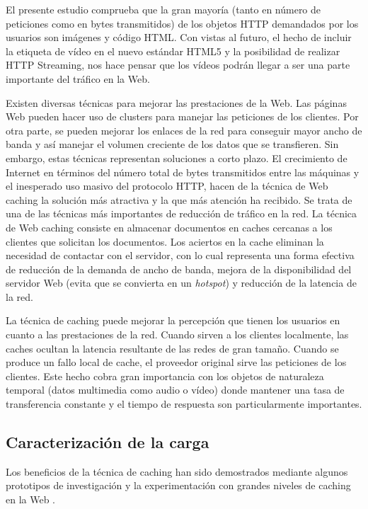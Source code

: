 \documentclass[twocolumn]{Jornadas}
\begin{document}
El presente estudio comprueba que la gran mayoría (tanto en número de peticiones como en bytes transmitidos) de los objetos HTTP demandados por los usuarios son imágenes y código HTML. Con vistas al futuro, el hecho de incluir la etiqueta de vídeo en el nuevo estándar HTML5 y la posibilidad de realizar HTTP Streaming, nos hace pensar que los vídeos podrán llegar a ser una parte importante del tráfico en la Web.

Existen diversas técnicas para mejorar las prestaciones de la Web. Las páginas Web pueden hacer uso de clusters para manejar las peticiones de los clientes. Por otra parte, se pueden mejorar los enlaces de la red para conseguir mayor ancho de banda y así manejar el volumen creciente de los datos que se transfieren. Sin embargo, estas técnicas representan soluciones a corto plazo. El crecimiento de Internet en términos del número total de bytes transmitidos entre las máquinas y el inesperado uso masivo del protocolo HTTP, hacen de la técnica de Web caching la solución más atractiva y la que más atención ha recibido. Se trata de una de las técnicas más importantes de reducción de tráfico en la red. La técnica de Web caching consiste en almacenar documentos en caches cercanas a los clientes que solicitan los documentos. Los aciertos en la cache eliminan la necesidad de contactar con el servidor, con lo cual representa una forma efectiva de reducción de la demanda de ancho de banda, mejora de la disponibilidad del servidor Web (evita que se convierta en un \emph{hotspot}) y reducción de la latencia de la red.

La técnica de caching puede mejorar la percepción que tienen los usuarios en cuanto a las prestaciones de la red. Cuando sirven a los clientes localmente, las caches ocultan la latencia resultante de las redes de gran tamaño. Cuando se produce un fallo local de cache, el proveedor original sirve las peticiones de los clientes.
Este hecho cobra gran importancia con los objetos de naturaleza temporal (datos multimedia como audio o vídeo) donde mantener una tasa de transferencia constante y el tiempo de respuesta son particularmente importantes.

\subsection{Caracterización de la carga}
Los beneficios de la técnica de caching han sido demostrados mediante algunos prototipos de investigación y la experimentación con grandes niveles de caching en la Web \cite{squid}. 
\end{document}
